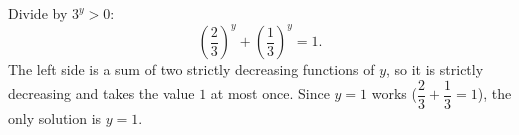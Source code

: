 Divide by $3^y>0$:
\[
\left(\dfrac{2}{3}\right)^y+\left(\dfrac{1}{3}\right)^y=1 .
\]
The left side is a sum of two strictly decreasing functions of $y$, so it is strictly decreasing and takes the value $1$ at most once. Since $y=1$ works ($\dfrac{2}{3}+\dfrac{1}{3}=1$), the only solution is $\boxed{y=1}$.
